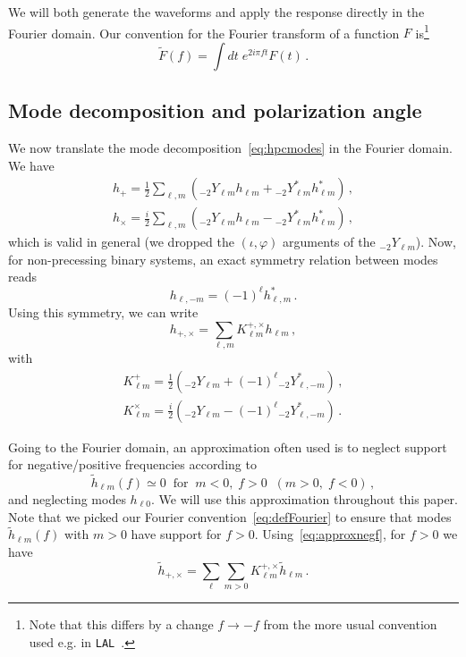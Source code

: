 \documentclass[aps,showpacs,twocolumn,prd,superscriptaddress,nofootinbib]{revtex4-1}
\newcommand{\be}{\begin{equation}}
\newcommand{\ee}{\end{equation}}
\newcommand{\bsub}{\begin{subequations}}
\newcommand{\esub}{\end{subequations}}
\newcommand{\sYlm}{{}_{-2}Y_{\ell m}}
\newcommand{\sYlmstar}{{}_{-2}Y_{\ell m}^{*}}
\newcommand{\sYlminusmstar}{{}_{-2}Y_{\ell, -m}^{*}}
\begin{document}
We will both generate the waveforms and apply the response directly in the Fourier domain. Our convention for the Fourier transform of a function $F$ is\footnote{Note that this differs by a change $f\rightarrow -f$ from the more usual convention used e.g. in \texttt{LAL}~\cite{lal}.}
\be\label{eq:defFourier}
	\tilde{F}(f) = \int dt \; e^{2 i \pi f t} F(t) \,.
\ee


\subsection{Mode decomposition and polarization angle}
\label{sec:modespol}

We now translate the mode decomposition~\eqref{eq:hpcmodes} in the Fourier domain. We have
\bsub
\begin{align}
	h_{+} = \frac{1}{2} \sum_{\ell, m} \left( \sYlm h_{\ell m} + \sYlmstar h_{\ell m}^{*} \right) \,,\\
	h_{\times} = \frac{i}{2} \sum_{\ell, m} \left( \sYlm h_{\ell m} - \sYlmstar h_{\ell m}^{*} \right) \,,
\end{align}
\esub
which is valid in general (we dropped the $(\iota, \varphi)$ arguments of the $\sYlm$). Now, for non-precessing binary systems, an exact symmetry relation between modes reads
\be\label{eq:nonprecsymmetry}
	h_{\ell, -m} = (-1)^{\ell} h_{\ell, m}^{*} \,.
\ee
Using this symmetry, we can write
\be
	h_{+,\times} = \sum_{\ell, m} K_{\ell m}^{+, \times} h_{\ell m} \,,
\ee
with
\bsub
\begin{align}
	K_{\ell m}^{+} =\frac{1}{2} \left( \sYlm + (-1)^{\ell} \sYlminusmstar \right) \,,\\
	K_{\ell m}^{\times} = \frac{i}{2} \left( \sYlm - (-1)^{\ell} \sYlminusmstar \right) \,.
\end{align}
\esub

Going to the Fourier domain, an approximation often used is to neglect support for negative/positive frequencies according to
\be\label{eq:approxnegf}
	\tilde{h}_{\ell m} (f) \simeq 0 \;\; \text{for} \;\; m<0, \; f>0 \;\; ( m>0, \; f<0 )\,,
\ee
and neglecting modes $h_{\ell 0}$. We will use this approximation throughout this paper. Note that we picked our Fourier convention~\eqref{eq:defFourier} to ensure that modes $\tilde{h}_{\ell m} (f)$ with $m>0$ have support for $f>0$. Using~\eqref{eq:approxnegf}, for $f>0$ we have
\be
	\tilde{h}_{+,\times} = \sum_{\ell} \sum_{m>0} K_{\ell m}^{+, \times} \tilde{h}_{\ell m} \,.
\ee
\end{document}
